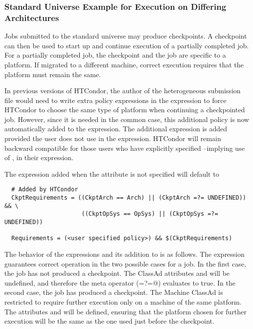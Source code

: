 \subsubsection{Standard Universe Example for Execution on Differing Architectures} 

Jobs submitted to the standard universe may produce checkpoints.
A checkpoint can then be used to start up and continue execution
of a partially completed job.
For a partially completed job, the checkpoint and the job are specific
to a platform.
If migrated to a different machine, correct execution requires that
the platform must remain the same.

In previous versions of HTCondor, the author of the heterogeneous
submission file would need to write extra policy expressions in the
 expression to force HTCondor to choose the
same type of platform when continuing a checkpointed job.
However, since it is needed in the common case, this
additional policy is now automatically added
to the  expression.
The additional expression is added
provided the user does not use
 in the  expression.
HTCondor will remain backward compatible for those users who have explicitly
specified --implying use of ,
in their  expression.

The expression added when the attribute  is not specified 
will default to

\footnotesize
\begin{verbatim}
  # Added by HTCondor
  CkptRequirements = ((CkptArch == Arch) || (CkptArch =?= UNDEFINED)) && \
                      ((CkptOpSys == OpSys) || (CkptOpSys =?= UNDEFINED))

  Requirements = (<user specified policy>) && $(CkptRequirements)
\end{verbatim}
\normalsize

The behavior of the  expressions and its addition to
\AdAttr{requirements} is as follows.
The  expression guarantees correct operation
in the two possible cases for a job.
In the first case, the job has not produced a checkpoint.
The ClassAd attributes  and 
will be undefined, and therefore the meta operator (\verb@=?=@)
evaluates to true.
In the second case, the job has produced a checkpoint.
The Machine ClassAd is restricted to require further execution
only on a machine of the same platform.
The attributes  and 
will be defined, ensuring that the platform chosen for further
execution will be the same as the one used just before the
checkpoint.

